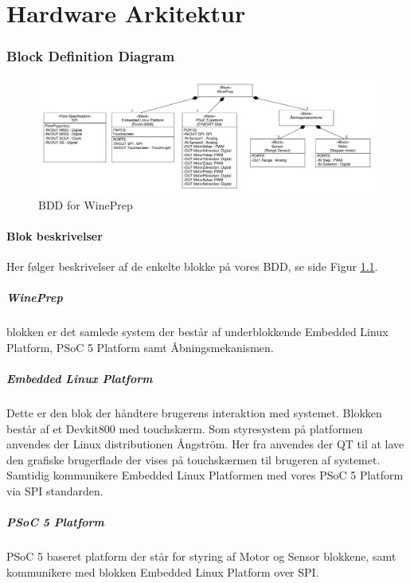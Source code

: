 \chapter{Hardware Arkitektur}

\subsection{Block Definition Diagram}

\begin{figure}[H]
	\centering
	\includegraphics[scale=0.3]{blockdefinitiondiagram}
	\caption{BDD for WinePrep}
	\label{BDD}
\end{figure}

\subsubsection{Blok beskrivelser}
Her følger beskrivelser af de enkelte blokke på vores BDD, se side \pageref{BDD} Figur \ref{BDD}.

\paragraph{WinePrep} blokken er det samlede system der består af underblokkende Embedded Linux Platform, PSoC 5 Platform samt Åbningsmekanismen.

\paragraph{Embedded Linux Platform} Dette er den blok der håndtere brugerens interaktion med systemet. Blokken består af et Devkit800 med touchskærm. Som styresystem på platformen anvendes der Linux distributionen Ångström. Her fra anvendes der QT til at lave den grafiske brugerflade der vises på touchskærmen til brugeren af systemet. Samtidig kommunikere Embedded Linux Platformen med vores PSoC 5 Platform via SPI standarden.

\paragraph{PSoC 5 Platform} PSoC 5 baseret platform der står for styring af Motor og Sensor blokkene, samt kommunikere med blokken Embedded Linux Platform over SPI.

